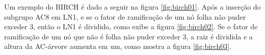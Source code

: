 Um exemplo do \acrshort{BIRCH} é dado a seguir na figura \ref{fig:birch01}. Após a inserção do subgrupo AC8 em LN1, e se o fator de ramificação de um nó folha não puder exceder 3, então o LN1 é dividido, como exibe a figura \ref{fig:birch02}. Se o fator de ramificação de um nó que não é folha não puder exceder 3, a raiz é dividida e a altura da AC-árvore aumenta em um, como mostra a figura \ref{fig:birch03}.

\begin{figure}[!ht]
	\centering
\end{figure}

\begin{figure}[!ht]
	\centering
\end{figure}

